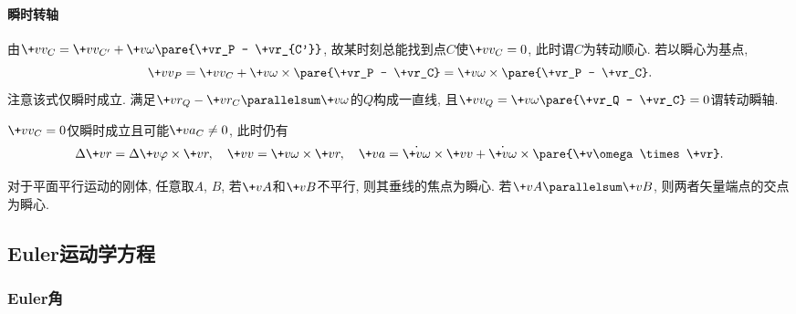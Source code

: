 \documentclass[../LectureNotes.tex]{subfiles}
\begin{document}
\paragraph{瞬时转轴} %
\label{par:瞬时转轴}

由$\+vv_C = \+vv_{C'} + \+v\omega\pare{\+vr_P - \+vr_{C'}}$, 故某时刻总能找到点$C$使$\+vv_C = 0$, 此时谓$C$为转动顺心. 若以瞬心为基点,
\[ \+vv_P = \+vv_C + \+v\omega \times\pare{\+vr_P - \+vr_C} = \+v\omega\times\pare{\+vr_P - \+vr_C}. \]
注意该式仅瞬时成立. 满足$\+vr_Q - \+vr_C \parallelsum \+v\omega$的$Q$构成一直线, 且$\+vv_Q = \+v\omega\pare{\+vr_Q - \+vr_C} = 0$谓转动瞬轴.
\begin{pitfall}
    $\+vv_C = 0$仅瞬时成立且可能$\+va_C \neq 0$, 此时仍有
    \[ \Delta \+vr = \Delta\+v\varphi \times\+vr,\quad \+vv = \+v\omega\times\+vr,\quad \+va = \dot{\+v\omega}\times\+vv + \dot{\+v\omega}\times\pare{\+v\omega\times\+vr}. \]
\end{pitfall}
对于平面平行运动的刚体, 任意取$A$, $B$, 若$\+vA$和$\+vB$不平行, 则其垂线的焦点为瞬心. 若$\+vA\parallelsum \+vB$, 则两者矢量端点的交点为瞬心.




\subsection{Euler运动学方程} %
\label{sub:euler运动学方程}

\subsubsection{Euler角} %
\label{ssub:euler角}

\begin{figure}[ht]
    \centering
\end{figure}
\end{document}
